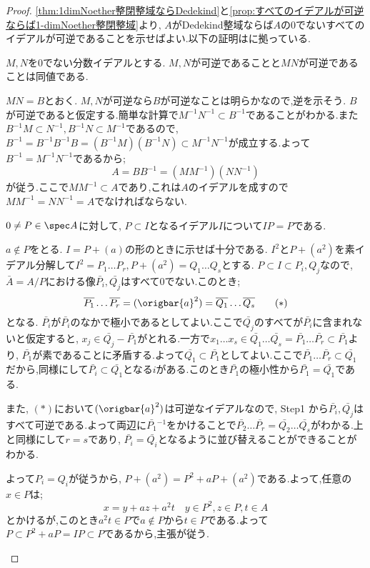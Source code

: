 \begin{proof}
	\ref{thm:1dimNoether整閉整域ならDedekind}と\ref{prop:すべてのイデアルが可逆ならば1-dimNoether整閉整域}より, $A$がDedekind整域ならば$A$の0でないすべてのイデアルが可逆であることを示せばよい.以下の証明は\cite{matsu}に拠っている.
	
	\begin{step}
		\item $M,N$を0でない分数イデアルとする.  $M,N$が可逆であることと$MN$が可逆であることは同値である.
		
		$MN=B$とおく. $M,N$が可逆なら$B$が可逆なことは明らかなので,逆を示そう. $B$が可逆であると仮定する.簡単な計算で$M^{-1}N^{-1}\subset B^{-1}$であることがわかる.また$B^{-1}M\subset N^{-1}, B^{-1}N\subset M^{-1}$であるので, $B^{-1}=B^{-1}B^{-1}B=(B^{-1}M)(B^{-1}N)\subset M^{-1}N^{-1}$が成立する.よって$B^{-1}=M^{-1}N^{-1}$であるから;
		\[A=BB^{-1}=(MM^{-1})(NN^{-1})\]
		が従う.ここで$MM^{-1}\subset A$であり,これは$A$のイデアルを成すので$MM^{-1}=NN^{-1}=A$でなければならない.
	
		\item $0\neq P\in\spec A$に対して, $P\subset I$となるイデアル$I$について$IP=P$である.
		
		$a\not\in P$をとる. $I=P+(a)$の形のときに示せば十分である. $I^2$と$P+(a^2)$を素イデアル分解して$I^2=P_1\dots P_r,P+(a^2)=Q_1\dots Q_s$とする. $P\subset I\subset P_i,Q_j$なので, $\bar{A}=A/P$における像$\bar{P_i},\bar{Q_j}$はすべて0でない.このとき;
		\[\bar{P_1}\dots\bar{P_r}=(\origbar{a}^2)=\bar{Q_1}\dots\bar{Q_s}\tag{$\ast$}\]
		となる. $\bar{P_i}$が$\bar{P_i}$のなかで極小であるとしてよい.ここで$\bar{Q_j}$のすべてが$\bar{P_i}$に含まれないと仮定すると, $x_j\in \bar{Q_j}-\bar{P_1}$がとれる.一方で$x_1\dots x_s\in \bar{Q_1}\dots\bar{Q_s}=\bar{P_1}\dots\bar{P_r}\subset\bar{P_1}$より, $\bar{P_1}$が素であることに矛盾する.よって$\bar{Q_1}\subset\bar{P_1}$としてよい.ここで$\bar{P_1}\dots\bar{P_r}\subset\bar{Q_1}$だから,同様にして$\bar{P_i}\subset\bar{Q_1}$となる$i$がある.このとき$\bar{P_1}$の極小性から$\bar{P_1}=\bar{Q_1}$である.
		
		また, $(\ast)$において$(\origbar{a}^2)$は可逆なイデアルなので, Step1 から$\bar{P_i},\bar{Q_j}$はすべて可逆である.よって両辺に$\bar{P_1}{}^{-1}$をかけることで$\bar{P_2}\dots\bar{P_r}=\bar{Q_2}\dots\bar{Q_s}$がわかる.上と同様にして$r=s$であり, $\bar{P_i}=\bar{Q_i}$となるように並び替えることができることがわかる.
		
		よって$P_i=Q_i$が従うから, $P+(a^2)=P^2+aP+(a^2)$である.よって,任意の$x\in P$は;
		\[x=y+az+a^2t\quad y\in P^2,z\in P,t\in A\]
		とかけるが,このとき$a^2t\in P$で$a\not\in P$から$t\in P$である.よって$P\subset P^2+aP=IP\subset P$であるから,主張が従う.
		

\end{step}
\end{proof}
